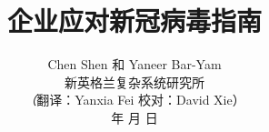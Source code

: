 \documentclass[onecolumn,journal]{IEEEtran}
\begin{document}
\title{\color{Brown}  企业应对新冠病毒指南
\vspace{-0.35ex}}
\author{Chen Shen 和 Yaneer Bar-Yam \\ 新英格兰复杂系统研究所 \\
\vspace{+0.35ex}
\small{\textit（{翻译：Yanxia Fei  校对：David Xie}）}\\
  年  月  日
  \vspace{-8ex} \\
\textbf{}
 }

\maketitle




\thispagestyle{empty} %





\end{document}
